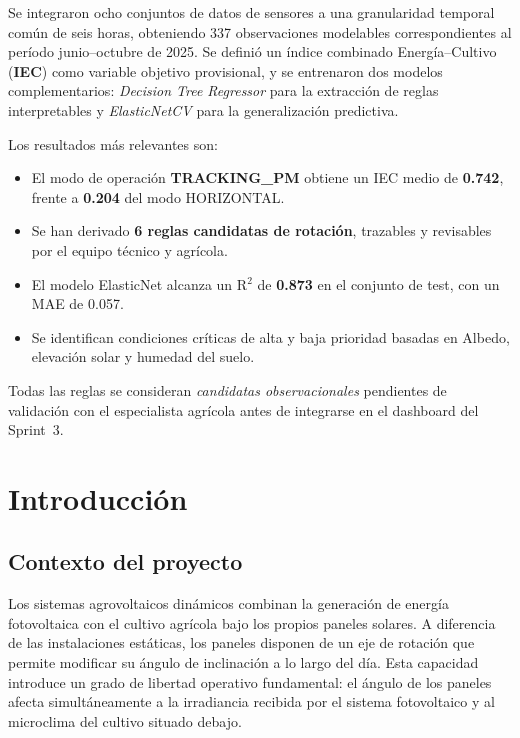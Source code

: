 \documentclass[12pt,a4paper]{article}
\begin{document}
Se integraron ocho conjuntos de datos de sensores a una granularidad temporal común de
seis horas, obteniendo 337 observaciones modelables correspondientes al período
junio--octubre de 2025. Se definió un índice combinado Energía--Cultivo (\textbf{IEC})
como variable objetivo provisional, y se entrenaron dos modelos complementarios:
\textit{Decision Tree Regressor} para la extracción de reglas interpretables y
\textit{ElasticNetCV} para la generalización predictiva.

Los resultados más relevantes son:

\begin{itemize}[noitemsep]
    \item El modo de operación \textbf{TRACKING\_PM} obtiene un IEC medio de \textbf{0.742},
          frente a \textbf{0.204} del modo HORIZONTAL.
    \item Se han derivado \textbf{6 reglas candidatas de rotación}, trazables y revisables
          por el equipo técnico y agrícola.
    \item El modelo ElasticNet alcanza un R$^2$ de \textbf{0.873} en el conjunto de test,
          con un MAE de 0.057.
    \item Se identifican condiciones críticas de alta y baja prioridad basadas en Albedo,
          elevación solar y humedad del suelo.
\end{itemize}

Todas las reglas se consideran \textit{candidatas observacionales} pendientes de validación
con el especialista agrícola antes de integrarse en el dashboard del Sprint~3.

\vspace{0.5cm}
\tableofcontents

\newpage
\section{Introducción}

\subsection{Contexto del proyecto}

Los sistemas agrovoltaicos dinámicos combinan la generación de energía fotovoltaica con
el cultivo agrícola bajo los propios paneles solares. A diferencia de las instalaciones
estáticas, los paneles disponen de un eje de rotación que permite modificar su ángulo de
inclinación a lo largo del día. Esta capacidad introduce un grado de libertad operativo
fundamental: el ángulo de los paneles afecta simultáneamente a la irradiancia recibida
por el sistema fotovoltaico y al microclima del cultivo situado debajo.
\end{document}
